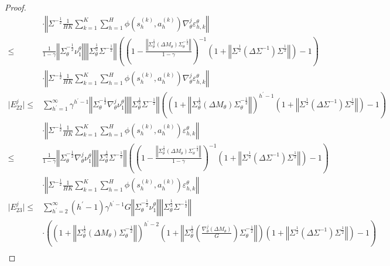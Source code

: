 \documentclass{article}
\numberwithin{equation}{section}
\begin{document}
\begin{proof}
\begin{align*}
    &\cdot\left\Vert\Sigma^{-\frac{1}{2}}\frac{1}{HK}\sum_{k=1}^K\sum_{h=1}^H\phi\left(s_h^{(k)},a_h^{(k)}\right)\nabla_\theta^j\varepsilon_{h,k}^\theta\right\Vert\\
    \leq&\frac{1}{1-\gamma}\left\Vert\Sigma_\theta^{-\frac{1}{2}}\nu^\theta_1\right\Vert\left\Vert\Sigma_\theta^{\frac{1}{2}}\Sigma^{-\frac{1}{2}}\right\Vert\left(\left(1-\frac{\left\Vert\Sigma_\theta^{\frac{1}{2}}\left(\Delta M_\theta\right)\Sigma_\theta^{-\frac{1}{2}}\right\Vert}{1-\gamma}\right)^{-1}\left(1+\left\Vert\Sigma^{\frac{1}{2}}\left(\Delta\Sigma^{-1}\right)\Sigma^{\frac{1}{2}}\right\Vert\right)-1\right)\\
    &\cdot\left\Vert\Sigma^{-\frac{1}{2}}\frac{1}{HK}\sum_{k=1}^K\sum_{h=1}^H\phi\left(s_h^{(k)},a_h^{(k)}\right)\nabla_\theta^j\varepsilon_{h,k}^\theta\right\Vert\\
    \vert E_{22}^j\vert\leq&\sum_{h^\prime=1}^\infty\gamma^{h^\prime-1}\left\Vert\Sigma_\theta^{-\frac{1}{2}}\nabla_\theta^j\nu^\theta_1\right\Vert\left\Vert\Sigma_\theta^{\frac{1}{2}}\Sigma^{-\frac{1}{2}}\right\Vert\left(\left(1+\left\Vert\Sigma_\theta^{\frac{1}{2}}\left(\Delta M_\theta\right)\Sigma_\theta^{-\frac{1}{2}}\right\Vert\right)^{h^\prime-1}\left(1+\left\Vert\Sigma^{\frac{1}{2}}\left(\Delta\Sigma^{-1}\right)\Sigma^{\frac{1}{2}}\right\Vert\right)-1\right)\\
    &\cdot\left\Vert\Sigma^{-\frac{1}{2}}\frac{1}{HK}\sum_{k=1}^K\sum_{h=1}^H\phi\left(s_h^{(k)},a_h^{(k)}\right)\varepsilon_{h,k}^\theta\right\Vert\\
    \leq&\frac{1}{1-\gamma}\left\Vert\Sigma_\theta^{-\frac{1}{2}}\nabla_\theta^j\nu^\theta_1\right\Vert\left\Vert\Sigma_\theta^{\frac{1}{2}}\Sigma^{-\frac{1}{2}}\right\Vert\left(\left(1-\frac{\left\Vert\Sigma_\theta^{\frac{1}{2}}\left(\Delta M_\theta\right)\Sigma_\theta^{-\frac{1}{2}}\right\Vert}{1-\gamma}\right)^{-1}\left(1+\left\Vert\Sigma^{\frac{1}{2}}\left(\Delta\Sigma^{-1}\right)\Sigma^{\frac{1}{2}}\right\Vert\right)-1\right)\\
    &\cdot\left\Vert\Sigma^{-\frac{1}{2}}\frac{1}{HK}\sum_{k=1}^K\sum_{h=1}^H\phi\left(s_h^{(k)},a_h^{(k)}\right)\varepsilon_{h,k}^\theta\right\Vert\\
    \vert E_{23}^j\vert\leq&\sum_{h^\prime=2}^\infty(h^\prime-1)\gamma^{h^\prime-1}G\left\Vert\Sigma_\theta^{-\frac{1}{2}}\nu^\theta_1\right\Vert\left\Vert\Sigma_\theta^{\frac{1}{2}}\Sigma^{-\frac{1}{2}}\right\Vert\\
    &\cdot\left(\left(1+\left\Vert\Sigma_\theta^{\frac{1}{2}}\left(\Delta M_\theta\right)\Sigma_\theta^{-\frac{1}{2}}\right\Vert\right)^{h^\prime-2}\left(1+\left\Vert\Sigma_\theta^{\frac{1}{2}}\left(\frac{\nabla_\theta^j\left(\Delta M_\theta\right)}{G}\right)\Sigma_\theta^{-\frac{1}{2}}\right\Vert\right)\left(1+\left\Vert\Sigma^{\frac{1}{2}}\left(\Delta\Sigma^{-1}\right)\Sigma^{\frac{1}{2}}\right\Vert\right)-1\right)\\

\end{align*}
\end{proof}
\end{document}
